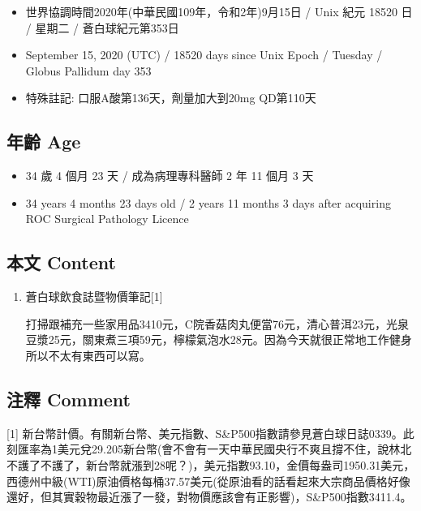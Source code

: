 \documentclass[
]{article}
\providecommand{\tightlist}{%
  \setlength{\itemsep}{0pt}\setlength{\parskip}{0pt}}
\begin{document}
\begin{itemize}
\tightlist
\item
  世界協調時間2020年(中華民國109年，令和2年)9月15日 / Unix 紀元 18520 日
  / 星期二 / 蒼白球紀元第353日
\item
  September 15, 2020 (UTC) / 18520 days since Unix Epoch / Tuesday /
  Globus Pallidum day 353
\item
  特殊註記: 口服A酸第136天，劑量加大到20mg QD第110天
\end{itemize}

\hypertarget{ux5e74ux9f61-age-14}{%
\subsection{年齡 Age}\label{ux5e74ux9f61-age-14}}

\begin{itemize}
\tightlist
\item
  34 歲 4 個月 23 天 / 成為病理專科醫師 2 年 11 個月 3 天
\item
  34 years 4 months 23 days old / 2 years 11 months 3 days after
  acquiring ROC Surgical Pathology Licence
\end{itemize}

\hypertarget{ux672cux6587-content-14}{%
\subsection{本文 Content}\label{ux672cux6587-content-14}}

\begin{enumerate}
\def\labelenumi{\arabic{enumi}.}
\item
  蒼白球飲食誌暨物價筆記{[}1{]}

  打掃跟補充一些家用品3410元，C院香菇肉丸便當76元，清心普洱23元，光泉豆漿25元，關東煮三項59元，檸檬氣泡水28元。因為今天就很正常地工作健身所以不太有東西可以寫。
\end{enumerate}

\hypertarget{ux6ce8ux91cb-comment-14}{%
\subsection{注釋 Comment}\label{ux6ce8ux91cb-comment-14}}

{[}1{]}
新台幣計價。有關新台幣、美元指數、S\&P500指數請參見蒼白球日誌0339。此刻匯率為1美元兌29.205新台幣(會不會有一天中華民國央行不爽且撐不住，說林北不護了不護了，新台幣就漲到28呢？)，美元指數93.10，金價每盎司1950.31美元，西德州中級(WTI)原油價格每桶37.57美元(從原油看的話看起來大宗商品價格好像還好，但其實穀物最近漲了一發，對物價應該會有正影響)，S\&P500指數3411.4。
\end{document}
